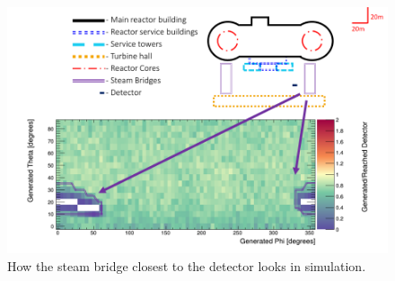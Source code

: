 
\newpage
\begin{figure}[htbp]
  \centering
  \begin{turn}{-90}
  \begin{minipage}{9in}
  \centering
    \includegraphics[scale = 0.8]{Chapter5/Figs/wylfaRasterNew/steamBridgeCloseGen_Reached.png}
  \caption{How the steam bridge closest to the detector looks in simulation.}
  \label{fig:steamBridgeCloseGen_Reached}
  \end{minipage}
  \end{turn}
\end{figure}


